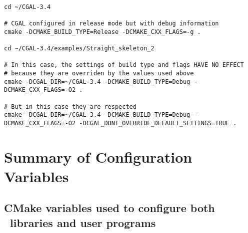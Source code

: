 {\ccTexHtml{\scriptsize}{}
\begin{verbatim}

cd ~/CGAL-3.4

# CGAL configured in release mode but with debug information 
cmake -DCMAKE_BUILD_TYPE=Release -DCMAKE_CXX_FLAGS=-g .

cd ~/CGAL-3.4/examples/Straight_skeleton_2

# In this case, the settings of build type and flags HAVE NO EFFECT
# because they are overriden by the values used above
cmake -DCGAL_DIR=~/CGAL-3.4 -DCMAKE_BUILD_TYPE=Debug -DCMAKE_CXX_FLAGS=-O2 . 

# But in this case they are respected
cmake -DCGAL_DIR=~/CGAL-3.4 -DCMAKE_BUILD_TYPE=Debug -DCMAKE_CXX_FLAGS=-O2 -DCGAL_DONT_OVERRIDE_DEFAULT_SETTINGS=TRUE . 

\end{verbatim}
}

\section{Summary of Configuration Variables}

\subsection{CMake variables used to configure both \cgal\ libraries and user programs}

